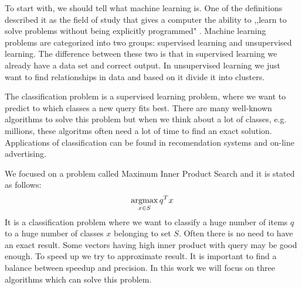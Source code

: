 To start with, we should tell what machine learning is. 
One of the definitions described it as the field of study that gives a computer the ability to ,,learn to solve problems without being explicitly programmed" \cite{koza}. 
Machine learning problems are categorized into two groups: supervised learning and unsupervised learning. 
The difference between these two is that in supervised learning we already have a data set and correct output. 
In unsupervised learning we just want to find relationships in data and based on it divide it into clusters.
\par
The classification problem is a supervised learning problem, where we want to predict to which classes a new query fits best. 
There are many well-known algorithms to solve this problem but when we think about a lot of classes, e.g. millions, these algoritms often need a lot of time to find an exact solution. 
Applications of classification can be found in recomendation systems and on-line advertising.
\par
We focused on a problem called Maximum Inner Product Search and it is stated as follows: 
\[ \operatorname*{argmax}_{x \in S} q^T x \]
It is a classification problem where we want to classify a huge number of items $q$  to a huge number of classes $x$ belonging to set $S$. 
Often there is no need to have an exact result. 
Some vectors having high inner product with query may be good enough. 
To speed up we try to approximate result. 
It is important to find a balance between speedup and precision. 
In this work we will focus on three algorithms which can solve this problem.

